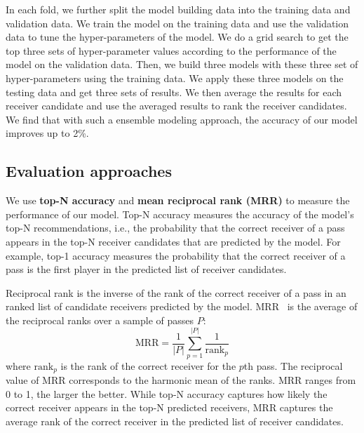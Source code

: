 In each fold, we further split the model building data into the training data and validation data.
We train the model on the training data and use the validation data to tune the hyper-parameters of the model. %
We do a grid search to get the top three sets of hyper-parameter values according to the performance of the model on the validation data.
Then, we build three models with these three set of hyper-parameters using the training data. 
We apply these three models on the testing data and get three sets of results.
We then average the results for each receiver candidate and use the averaged results to rank the receiver candidates. We find that with such a ensemble modeling approach, the accuracy of our model improves up to 2\%.%




\subsection{Evaluation approaches}

We use \textbf{top-N accuracy} and \textbf{mean reciprocal rank (MRR)} to measure the performance of our model.
Top-N accuracy measures the accuracy of the model's top-N recommendations, i.e., the probability that the correct receiver of a pass appears in the top-N receiver candidates that are predicted by the model.
For example, top-1 accuracy measures the probability that the correct receiver of a pass is the first player in the predicted list of receiver candidates.

Reciprocal rank is the inverse of the rank of the correct receiver of a pass in an ranked list of candidate receivers predicted by the model.
MRR~\cite{Craswell2009} is the average of the reciprocal ranks over a sample of passes $P$:
\begin{equation}
  \textrm{MRR} = \frac{1}{|P|}\displaystyle\sum_{p=1}^{|P|}\frac{1}{\textrm{rank}_p}
\end{equation}
where $\textrm{rank}_p$ is the rank of the correct receiver for the $p$th pass.
The reciprocal value of MRR corresponds to the harmonic mean of the ranks.
MRR ranges from 0 to 1, the larger the better. 
While top-N accuracy captures how likely the correct receiver appears in the top-N predicted receivers, 
MRR captures the average rank of the correct receiver in the predicted list of receiver candidates.
 

